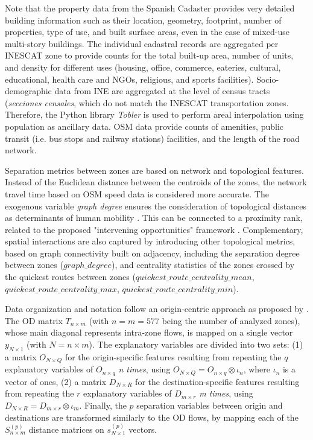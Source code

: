 Note that the property data from the Spanish Cadaster \citep{MinisteriodeHacienda.GobiernodeEspana2024SedeInicio} provides very detailed building information such as their location, geometry, footprint, number of properties, type of use, and built surface areas, even in the case of mixed-use multi-story buildings. The individual cadastral records are aggregated per INESCAT zone to provide counts for the total built-up area, number of units, and density for different uses (housing, office, commerce, eateries, cultural, educational, health care and NGOs, religious, and sports facilities). Socio-demographic data from INE are aggregated at the level of census tracts (\emph{secciones censales}, which do not match the INESCAT transportation zones. Therefore, the Python library \emph{Tobler} \citep{Toblercontributors2018ToblerManual} is used to perform areal interpolation using population as ancillary data. OSM data provide counts of amenities, public transit (i.e. bus stops and railway stations) facilities, and the length of the road network.

Separation metrics between zones are based on network and topological features. Instead of the Euclidean distance between the centroids of the zones, the network travel time based on OSM speed data \citep{OpenStreetMap, Boeing2017OSMnx:Networks} is considered more accurate. %
The exogenous variable \emph{graph degree} ensures the consideration of topological distances as determinants of human mobility \citep{Simini2012APatterns, Noulas2012AMobility, Ballerini2008InteractionStudy}. This can be connected to a proximity rank, related to the proposed "intervening opportunities" framework \citep{Stouffer1940InterveningDistance}. Complementary, spatial interactions are also captured by introducing other topological metrics, based on graph connectivity built on adjacency, including the separation degree between zones ($graph\_degree$), and centrality statistics of the zones crossed by the quickest routes between zones ($quickest\_route\_centrality\_mean$, $quickest\_route\_centrality\_max$, $quickest\_route\_centrality\_min$).

Data organization and notation follow an origin-centric approach as proposed by \citep{LeSage2008SpatialFlows}. The OD matrix  $T_{n \times m}$ (with $n = m= 577$ being the number of analyzed zones), whose main diagonal represents intra-zone flows, is mapped on a single vector $y_{N \times 1}$ (with $N = n \times m$). The explanatory variables are divided into two sets: (1) a matrix $O_{N \times Q}$ for the origin-specific features resulting from repeating the $q$ explanatory variables of $O_{n \times q}$ \emph{n times}, using $O_{N \times Q} = O_{n \times q} \otimes \iota_n$, where $\iota_n$ is a vector of ones, (2) a matrix $D_{N \times R}$ for the destination-specific features resulting from repeating the $r$ explanatory variables of $D_{m \times r}$ \emph{m times}, using $D_{N \times R} = D_{m \times r} \otimes \iota_m$. Finally, the $p$ separation variables between origin and destinations are transformed similarly to the OD flows, by mapping each of the $S_{n \times m}^{(p)}$ distance matrices on $s_{N \times 1}^{(p)}$ vectors.

